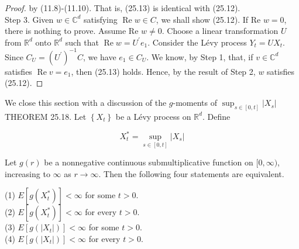 \documentclass[a4paper,11pt]{article}
\begin{document}
\begin{proof}
    by (11.8)-(11.10). That is, (25.13) is identical with (25.12). \\

    Step 3. Given $w \in \mathbb{C}^{d}$ satisfying $\operatorname{Re} w \in C$, we shall
    show (25.12). If Re $w=0$, there is nothing to prove. Assume Re $w \neq 0$. Choose a
    linear transformation $U$ from $\mathbb{R}^{d}$ onto $\mathbb{R}^{d}$ such that $\operatorname{Re} w=U^{\prime} e_{1}$.
    Consider the Lévy process $Y_{t}=U X_{t}$. Since $C_{U}=\left(U^{\prime}\right)^{-1} C$, we have $e_{1} \in C_{U}$.
    We know, by Step 1, that, if $v \in \mathbb{C}^{d}$ satisfies $\operatorname{Re} v=e_{1}$, then (25.13) holds.
    Hence, by the result of Step 2, $w$ satisfies (25.12).

\end{proof}


We close this section with a discussion of the $g$-moments of $\sup _{s \in[0, t]}\left|X_{s}\right|$ \\


THEOREM 25.18. Let $\left\{X_{t}\right\}$ be a Lévy process on $\mathbb{R}^{d}$. Define

\begin{equation*}
    X_{t}^{*}=\sup _{s \in[0, t]}\left|X_{s}\right| \tag{25.14}
\end{equation*}

Let $g(r)$ be a nonnegative continuous submultiplicative function on $[0, \infty)$, increasing to $\infty$ as $r \rightarrow \infty$.
Then the following four statements are equivalent.

(1) $E\left[g\left(X_{t}^{*}\right)\right]<\infty$ for some $t>0$. \\

(2) $E\left[g\left(X_{t}^{*}\right)\right]<\infty$ for every $t>0$. \\

(3) $E\left[g\left(\left|X_{t}\right|\right)\right]<\infty$ for some $t>0$. \\

(4) $E\left[g\left(\left|X_{t}\right|\right)\right]<\infty$ for every $t>0$. \\
\end{document}

